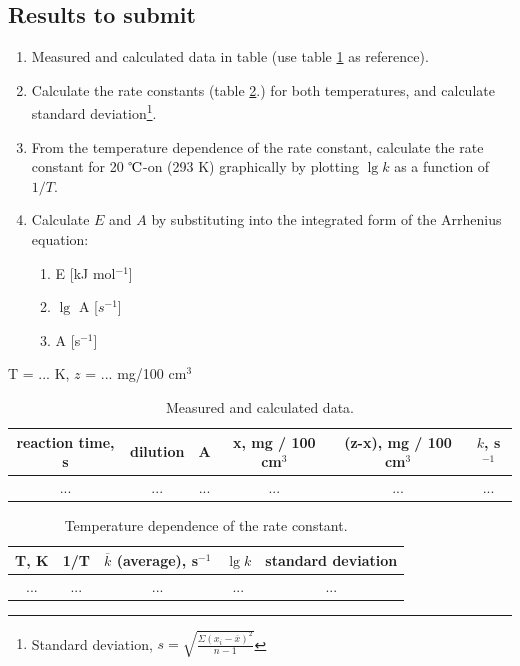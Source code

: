\subsection{Results to submit}

\begin{enumerate}
\item Measured and calculated data in table (use table \ref{table:tablazatos} as reference).
\item Calculate the rate constants (table \ref{table:seb}.) for both temperatures, and calculate standard deviation\footnote{Standard deviation, $s=\sqrt{\frac{\Sigma(x_i-\overline{x})^2}{n-1}}$}.
\item From the temperature dependence of the rate constant, calculate the rate constant for 20 $\celsius$-on (293 K) graphically by plotting $\lg k$ as a function of $1/T$.
\item Calculate $E$ and $A$ by substituting into the integrated form of the Arrhenius equation:
	\begin{enumerate}
		\item E [kJ mol$^{-1}$]
		\item $\lg$ A [$s^{-1}$]
		\item A [s$^{-1}$]
	\end{enumerate}
\end{enumerate}

\begin{table}[h!]
\caption{Measured and calculated data.}
\centering
T = ... K, $z$ = ... mg/100 cm$^3$
\begin{tabular}{|c|c|c|c|c|c|}
\hline
reaction time, s&dilution&A&x, mg / 100 cm$^3$ &(z-x), mg / 100 cm$^3$ & $k$, s$^{-1}$ \\
\hline
... & ... & ... & ... & ... & ... \\
\end{tabular}
\label{table:tablazatos}
\end{table}

\begin{table}[h!]
\caption{Temperature dependence of the rate constant.}
\centering
\begin{tabular}{|c|c|c|c|c|}
\hline
T, K& 1/T & $\overline{k}$ (average), s$^{-1}$ & $\lg k$ & standard deviation \\
\hline
... & ... & ... & ... & ... \\
\end{tabular}
\label{table:seb}
\end{table}

\vfill

